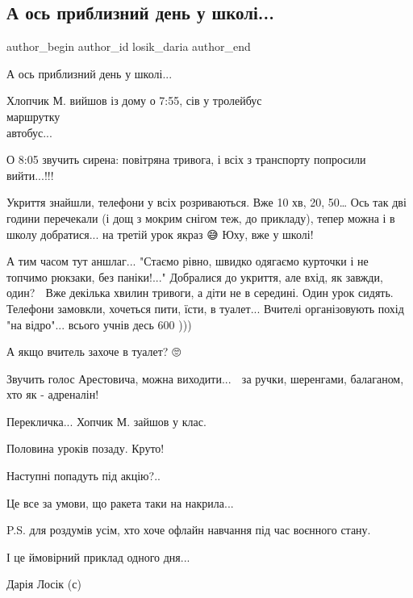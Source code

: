  
 
 
 
 
 
\subsection{А ось приблизний день у школі...}
\label{sec:01_08_2022.fb.losik_daria.1.den_u_shkoli}
 
\ifcmt
 author_begin
   author_id losik_daria
 author_end
\fi

А ось приблизний день у школі...

Хлопчик М. вийшов із дому о 7:55, сів у тролейбус\\маршрутку\\автобус... 

О 8:05 звучить сирена: повітряна тривога, і всіх з транспорту попросили
вийти...!!!

Укриття знайшли, телефони у всіх розриваються. Вже 10 хв, 20, 50… Ось так дві
години перечекали (і дощ з мокрим снігом теж, до прикладу), тепер можна і в
школу добратися... на третій урок якраз 😅 Юху, вже у школі!

А тим часом тут аншлаг... "Стаємо рівно, швидко одягаємо курточки і не топчимо
рюкзаки, без паніки!..." Добралися до укриття, але вхід, як завжди, один? 🙂 Вже
декілька хвилин тривоги, а діти не в середині. Один урок сидять. Телефони
замовкли, хочеться пити, їсти, в туалет... Вчителі організовують похід "на
відро"...  всього учнів десь 600 ))) 

А якщо вчитель захоче в туалет? 🙄

Звучить голос Арестовича, можна виходити... 🤩  за ручки, шеренгами, балаганом,
хто як  - адреналін! 

Перекличка... Хопчик М. зайшов у клас.

Половина уроків позаду. Круто! 

Наступні попадуть під акцію?..

Це все за умови, що ракета таки на накрила...

P.S.  для роздумів усім, хто хоче офлайн навчання під час воєнного стану. 

І це ймовірний приклад одного дня...

Дарія Лосік (с)

